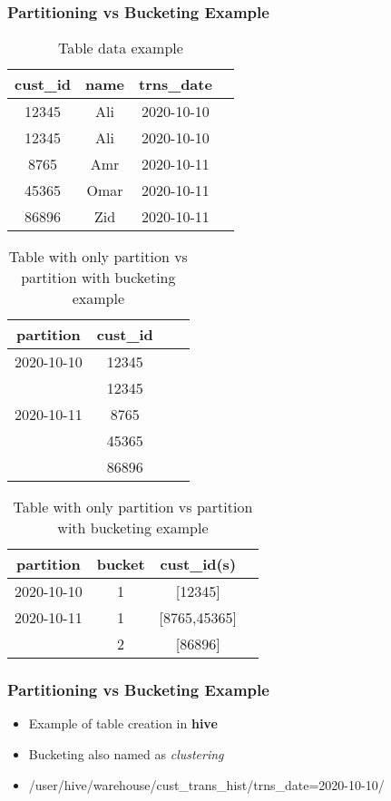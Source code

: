 \begin{frame}
	\frametitle{Partitioning vs Bucketing Example}
\begin{table}
	\begin{tabular}{|c|c|c|c|}
		\hline
		cust_id & name & trns_date \\
		\hline
		12345 & Ali &  2020-10-10 \\
		12345 & Ali &  2020-10-10\\
		\hline 
		8765 & Amr &  2020-10-11 \\
		45365 & Omar &  2020-10-11 \\
		86896 & Zid &  2020-10-11 \\
		\hline
	\end{tabular}
\quad

	\caption{Table data example}\label{eval_table}
\end{table}

\begin{table}
	\begin{tabular}{|c|c|c|c|}
		\hline
		partition & cust_id  \\
		\hline
		2020-10-10 & 12345 \\
				   & 12345\\
		\hline 
		2020-10-11 &  8765\\
				   & 45365  \\
		           & 86896 \\
		\hline
	\end{tabular}
	\quad
		\begin{tabular}{|c|c|c|c|}
		\hline
		partition & bucket & cust_id(s)  \\
		\hline
		2020-10-10 & 1 & [12345] \\
		\hline 
		2020-10-11 & 1 & [8765,45365]\\
				   & 2 & [86896] \\
		\hline
	\end{tabular}
	\caption{Table with only partition vs partition with bucketing example}\label{eval_table}
\end{table}

\end{frame}


\begin{frame}
	\frametitle{Partitioning vs Bucketing Example}
	
	\begin{itemize}[<+->]
		\item Example of table creation in \textbf{hive}
		\item Bucketing also named as \textit{clustering }
		\item /user/hive/warehouse/cust_trans_hist/trns_date=2020-10-10/
	\end{itemize}
	
			
\end{frame}


